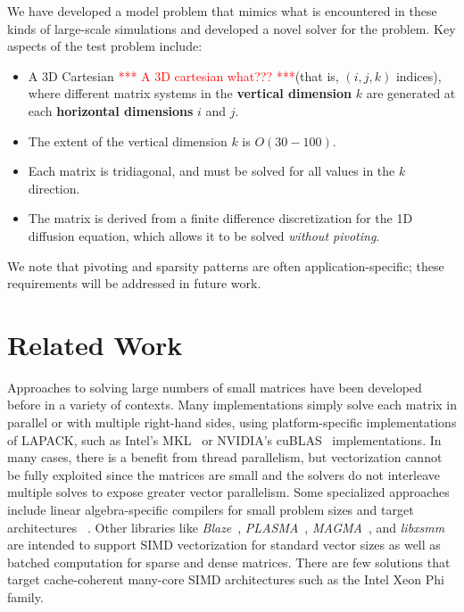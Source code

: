 \documentclass{sig-alternate-05-2015}
\newcommand{\fix}[1]{\textcolor{red}{#1}}
\begin{document}
We have developed a model problem that mimics what is encountered in these
  kinds of large-scale simulations and developed a novel solver for the problem.
Key aspects of the test problem include:
\begin{itemize}
\item A 3D Cartesian \fix{*** A 3D cartesian what??? ***}(that is, \((i,j,k)\) indices), where different matrix
  systems in the \textbf{vertical dimension} \(k\) are generated at each
  \textbf{horizontal dimensions} \(i\) and \(j\).
\item The extent of the vertical dimension \(k\) is \(O(30-100)\).
\item Each matrix is tridiagonal, and must be solved for all values in the
  \(k\) direction.
\item The matrix is derived from a finite difference discretization for the
  1D diffusion equation, which allows it to be solved \emph{without pivoting}.
\end{itemize}
We note that pivoting and sparsity patterns are often application-specific;
  these requirements will be addressed in future work.

\section{Related Work}
\label{sec:related_work}

Approaches to solving large numbers of small matrices have been 
  developed before in a variety of contexts.
Many implementations simply solve each matrix in parallel or with multiple
  right-hand sides, using platform-specific implementations of LAPACK, such as
  Intel's MKL~\cite{mkl_website} or NVIDIA's cuBLAS~\cite{cublas_website}
  implementations.
In many cases, there is a benefit from thread parallelism, 
  but vectorization cannot be fully exploited since the matrices are small and
  the solvers do not interleave multiple solves to expose greater vector
  parallelism.
Some specialized approaches include linear algebra-specific 
  compilers for small problem sizes and target architectures 
 ~\cite{Spampinato:2014, NelsonEtAl_2015}.
Other libraries like 
  \emph{Blaze}~\cite{BlazeSite}, 
  \emph{PLASMA}~\cite{PLASMASite},
  \emph{MAGMA}~\cite{Haidar:2015}, and 
  \emph{libxsmm}~\cite{libxsmm_website}
  are intended to support SIMD vectorization for standard vector sizes
  as well as batched computation for sparse and dense matrices.
There are few solutions that target cache-coherent many-core SIMD architectures
  such as the Intel Xeon Phi family.
\end{document}
